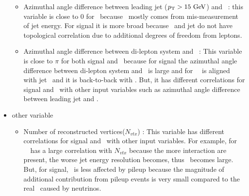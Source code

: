 \begin{itemize}
\begin{itemize}
\item Azimuthal angle difference between leading jet ($p_\mathrm{T}>15~\mathrm{Ge\kern -0.1em V}$) and \met\ :
      this variable is close to 0 for \dyll\ because \met\ mostly comes from mis-measurement 
      of jet energy. For signal it is more broad because \met\ and jet do not have 
      topological correlation due to additional degrees of freedom from leptons.


\item Azimuthal angle difference between di-lepton system and \met\ : This variable is close 
      to $\pi$ for both signal and \dyll\ because for signal the azimuthal angle difference 
      between di-lepton system and \met\ is large and for \dyll\ \met\ is aligned with jet 
      \pt\ and it is back-to-back with \ptll. But, it has different correlations for signal 
      and \dyll\ with other input variables such as azimuthal angle difference between 
      leading jet and \met.
      
\end{itemize}

%
\item other variable
\begin{itemize}
\item Number of reconstructed vertices($N_{vtx}$) : This variable has different correlations for 
      signal and \dyll\ with other input variables. For example, for \dyll\ \met\ has a 
      large correlation with $N_{vtx}$ because the more interaction are present, the worse 
      jet energy resolution becomes, thus \met\ becomes large. But, for signal, \met\ is 
      less affected by pileup because the magnitude of additional contribution from 
      pileup events is very small compared to the real \met\ caused by neutrinos. 

\end{itemize}

\end{itemize}

